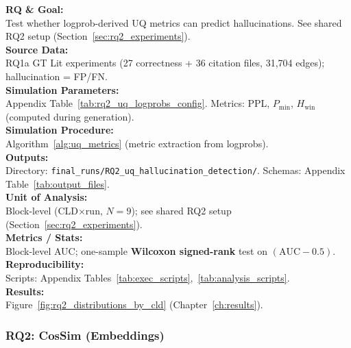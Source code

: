 \textbf{RQ \& Goal:}\\
Test whether logprob-derived UQ metrics can predict hallucinations. See shared RQ2 setup (Section~\ref{sec:rq2_experiments}).\\
\textbf{Source Data:}\\
RQ1a GT Lit experiments (27 correctness + 36 citation files, 31,704 edges); hallucination = FP/FN.\\
\textbf{Simulation Parameters:}\\
Appendix Table~\ref{tab:rq2_uq_logprobs_config}. Metrics: PPL, $P_{\min}$, $H_{\text{win}}$ (computed during generation).\\
\textbf{Simulation Procedure:}\\
Algorithm~\ref{alg:uq_metrics} (metric extraction from logprobs).\\
\textbf{Outputs:}\\
Directory: \texttt{final\_runs/RQ2\_uq\_hallucination\_detection/}. Schemas: Appendix Table~\ref{tab:output_files}.\\
\textbf{Unit of Analysis:}\\
Block-level (CLD$\times$run, $N=9$); see shared RQ2 setup (Section~\ref{sec:rq2_experiments}).\\
\textbf{Metrics / Stats:}\\
Block-level AUC; one-sample \textbf{Wilcoxon signed-rank} test on $(\mathrm{AUC}-0.5)$.\\
\textbf{Reproducibility:}\\
Scripts: Appendix Tables~\ref{tab:exec_scripts},~\ref{tab:analysis_scripts}.\\
\textbf{Results:}\\
Figure~\ref{fig:rq2_distributions_by_cld} (Chapter~\ref{ch:results}).

\subsubsection{RQ2: CosSim (Embeddings)}
\label{sec:rq2_cossim_embeddings}


